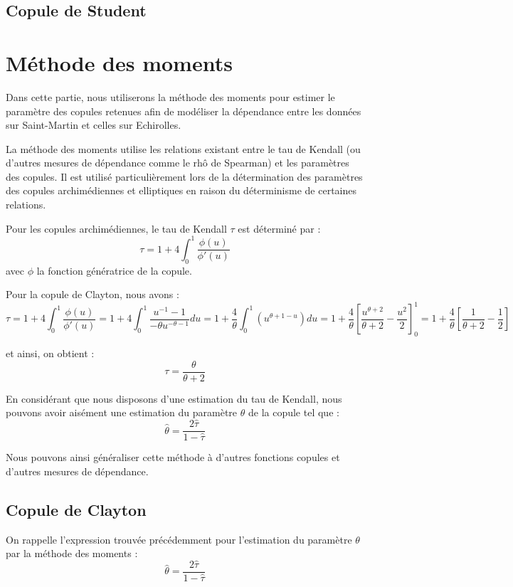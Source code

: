 \subsection{Copule de Student}

\section{Méthode des moments}

Dans cette partie, nous utiliserons la méthode des moments pour estimer le paramètre des copules retenues afin de modéliser la dépendance entre les données sur Saint-Martin et celles sur Echirolles.

La méthode des moments utilise les relations existant entre le tau de Kendall (ou d'autres mesures de dépendance comme le rhô de Spearman) et les paramètres des
copules. Il est utilisé particulièrement lors de la détermination des paramètres des copules archimédiennes
et elliptiques en raison du déterminisme de certaines relations.

Pour les copules archimédiennes, le tau de Kendall $\tau$ est déterminé par :
$$
\tau = 1 + 4 \int_0^1 \frac{\phi(u)}{\phi'(u)}
$$
avec $\phi$ la fonction génératrice de la copule.

Pour la copule de Clayton, nous avons :
$$
\tau = 1 + 4 \int_0^1 \frac{\phi(u)}{\phi'(u)} = 1 + 4 \int_0^1 \frac{u^{-1} - 1}{-\theta u^{-\theta -1}} du = 1 + \frac{4}{\theta} \int_0^1 (u^{\theta + 1 -u}) du
= 1 + \frac{4}{\theta} \left [  \frac{u^{\theta +2}}{\theta +2} - \frac{u^2}{2} \right ]_0^1 = 1 +\frac{4}{\theta} \left [ \frac{1}{\theta + 2} - \frac{1}{2}\right ]
$$

et ainsi, on obtient : 
$$
\tau = \frac{\theta}{\theta + 2}
$$

En considérant que nous disposons d'une estimation du tau de Kendall, nous pouvons avoir aisément une estimation du paramètre $\theta$ de la copule tel que :
$$
\widehat{\theta} = \frac{2 \widehat{\tau}}{1 - \widehat{\tau}}
$$

Nous pouvons ainsi généraliser cette méthode à d’autres fonctions copules et d’autres mesures de dépendance.

\subsection{Copule de Clayton}

On rappelle l'expression trouvée précédemment pour l'estimation du paramètre $\theta$ par la méthode des moments :
$$
\widehat{\theta} = \frac{2 \widehat{\tau}}{1 - \widehat{\tau}}
$$

